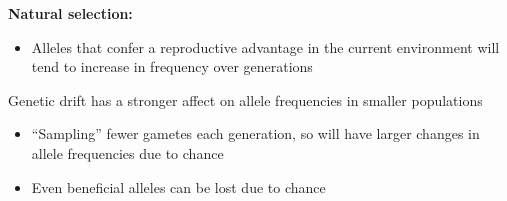 \begin{frame}
\begin{adjustwidth}{-1.5em}{-1.5em}
    \textbf{Natural selection:}
    \begin{itemize}
        \item Alleles that confer a reproductive advantage in the current
            environment will tend to increase in frequency over generations 
    \end{itemize}

    \vspace{5mm}

    \vspace{5mm}

    \vspace{5mm}
\end{adjustwidth}
\end{frame}

\begin{frame}
\begin{adjustwidth}{-1.5em}{-1.5em}
    Genetic drift has a stronger affect on allele frequencies in smaller
    populations
    \begin{itemize}
        \item ``Sampling'' fewer gametes each generation, so will have
            larger changes in allele frequencies due to chance
        \item Even beneficial alleles can be lost due to chance
    \end{itemize}

    \vspace{1cm}
\end{adjustwidth}
\end{frame}

